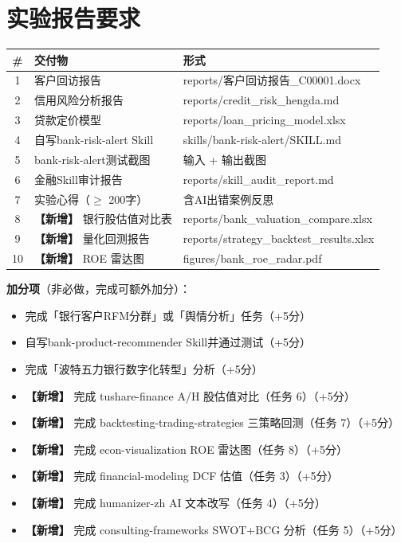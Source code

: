 \section*{实验报告要求}

\begin{table}[H]
\centering
\begin{tabular}{cll}
\toprule
\textbf{\#} & \textbf{交付物} & \textbf{形式} \\
\midrule
1 & 客户回访报告 & reports/客户回访报告\_C00001.docx \\
2 & 信用风险分析报告 & reports/credit\_risk\_hengda.md \\
3 & 贷款定价模型 & reports/loan\_pricing\_model.xlsx \\
4 & 自写bank-risk-alert Skill & skills/bank-risk-alert/SKILL.md \\
5 & bank-risk-alert测试截图 & 输入 + 输出截图 \\
6 & 金融Skill审计报告 & reports/skill\_audit\_report.md \\
7 & 实验心得（$\geq$ 200字） & 含AI出错案例反思 \\
8 & \textbf{【新增】} 银行股估值对比表 & reports/bank\_valuation\_compare.xlsx \\
9 & \textbf{【新增】} 量化回测报告 & reports/strategy\_backtest\_results.xlsx \\
10 & \textbf{【新增】} ROE 雷达图 & figures/bank\_roe\_radar.pdf \\
\bottomrule
\end{tabular}
\end{table}

\textbf{加分项}（非必做，完成可额外加分）：

\begin{itemize}[leftmargin=2em]
  \item 完成「银行客户RFM分群」或「舆情分析」任务（+5分）
  \item 自写bank-product-recommender Skill并通过测试（+5分）
  \item 完成「波特五力银行数字化转型」分析（+5分）
  \item \textbf{【新增】} 完成 tushare-finance A/H 股估值对比（任务 6）（+5分）
  \item \textbf{【新增】} 完成 backtesting-trading-strategies 三策略回测（任务 7）（+5分）
  \item \textbf{【新增】} 完成 econ-visualization ROE 雷达图（任务 8）（+5分）
  \item \textbf{【新增】} 完成 financial-modeling DCF 估值（任务 3）（+5分）
  \item \textbf{【新增】} 完成 humanizer-zh AI 文本改写（任务 4）（+5分）
  \item \textbf{【新增】} 完成 consulting-frameworks SWOT+BCG 分析（任务 5）（+5分）
\end{itemize}

